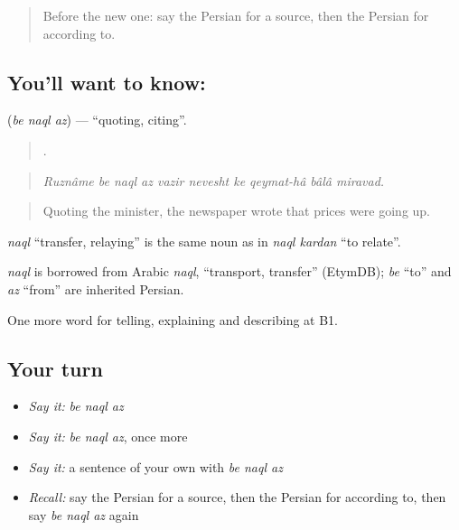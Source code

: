 \label{lesson:FA-C311-be-naql-az}



\begin{quote}
Before the new one: say the Persian for a source, then the Persian for according to.
\end{quote}

\subsection*{You'll want to know:   }
\textbf{  } (\emph{be naql az}) — \textquotedblleft{}quoting, citing\textquotedblright{}.

\begin{quote}
          .
\end{quote}

\begin{quote}
\emph{Ruznâme be naql az vazir nevesht ke qeymat-hâ bâlâ miravad.}
\end{quote}

\begin{quote}
Quoting the minister, the newspaper wrote that prices were going up.
\end{quote}

\emph{naql} \textquotedblleft{}transfer, relaying\textquotedblright{} is the same noun as in \emph{naql kardan} \textquotedblleft{}to relate\textquotedblright{}.

\begin{cousinweb}
\emph{naql} is borrowed from Arabic \emph{naql}, \textquotedblleft{}transport, transfer\textquotedblright{} (EtymDB); \emph{be} \textquotedblleft{}to\textquotedblright{} and \emph{az} \textquotedblleft{}from\textquotedblright{} are inherited Persian.
\end{cousinweb}

\begin{grammarlens}[title={What you've built}]
One more word for telling, explaining and describing at B1.
\end{grammarlens}

\subsection*{Your turn}
\begin{itemize}
\raggedright
  \item \emph{Say it:} \emph{be naql az}
  \item \emph{Say it:} \emph{be naql az}, once more
  \item \emph{Say it:} a sentence of your own with \emph{be naql az}
  \item \emph{Recall:} say the Persian for a source, then the Persian for according to, then say \emph{be naql az} again
\end{itemize}

